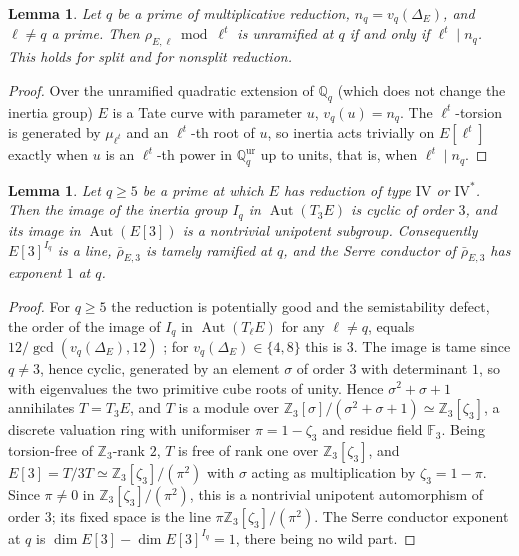 \documentclass[11pt]{amsart}
\newtheorem{lemma}[theorem]{Lemma}
\theoremstyle{definition}
\newcommand{\Q}{\mathbb{Q}}
\newcommand{\Z}{\mathbb{Z}}
\newcommand{\F}{\mathbb{F}}
\begin{document}
\begin{lemma}\label{lem:tamagawa-exp}
Let $q$ be a prime of multiplicative reduction, $n_q=v_q(\Delta_E)$, and $\ell\ne q$ a prime. Then $\rho_{E,\ell}\bmod\ell^t$ is unramified at $q$ if and only if $\ell^t\mid n_q$. This holds for split and for nonsplit reduction.
\end{lemma}

\begin{proof}
Over the unramified quadratic extension of $\Q_q$ (which does not change the inertia group) $E$ is a Tate curve with parameter $u$, $v_q(u)=n_q$. The $\ell^t$-torsion is generated by $\mu_{\ell^t}$ and an $\ell^t$-th root of $u$, so inertia acts trivially on $E[\ell^t]$ exactly when $u$ is an $\ell^t$-th power in $\Q_q^{\mathrm{ur}}$ up to units, that is, when $\ell^t\mid n_q$.
\end{proof}

\begin{lemma}\label{lem:IV}
Let $q\ge5$ be a prime at which $E$ has reduction of type $\mathrm{IV}$ or $\mathrm{IV}^*$. Then the image of the inertia group $I_q$ in $\operatorname{Aut}(T_3E)$ is cyclic of order $3$, and its image in $\operatorname{Aut}(E[3])$ is a nontrivial unipotent subgroup. Consequently $E[3]^{I_q}$ is a line, $\bar\rho_{E,3}$ is tamely ramified at $q$, and the Serre conductor of $\bar\rho_{E,3}$ has exponent $1$ at $q$.
\end{lemma}

\begin{proof}
For $q\ge5$ the reduction is potentially good and the semistability defect, the order of the image of $I_q$ in $\operatorname{Aut}(T_\ell E)$ for any $\ell\ne q$, equals $12/\gcd(v_q(\Delta_E),12)$ \cite{Kraus90}; for $v_q(\Delta_E)\in\{4,8\}$ this is $3$. The image is tame since $q\ne3$, hence cyclic, generated by an element $\sigma$ of order $3$ with determinant $1$, so with eigenvalues the two primitive cube roots of unity. Hence $\sigma^2+\sigma+1$ annihilates $T=T_3E$, and $T$ is a module over $\Z_3[\sigma]/(\sigma^2+\sigma+1)\simeq\Z_3[\zeta_3]$, a discrete valuation ring with uniformiser $\pi=1-\zeta_3$ and residue field $\F_3$. Being torsion-free of $\Z_3$-rank $2$, $T$ is free of rank one over $\Z_3[\zeta_3]$, and $E[3]=T/3T\simeq\Z_3[\zeta_3]/(\pi^2)$ with $\sigma$ acting as multiplication by $\zeta_3=1-\pi$. Since $\pi\ne0$ in $\Z_3[\zeta_3]/(\pi^2)$, this is a nontrivial unipotent automorphism of order $3$; its fixed space is the line $\pi\Z_3[\zeta_3]/(\pi^2)$. The Serre conductor exponent at $q$ is $\dim E[3]-\dim E[3]^{I_q}=1$, there being no wild part.
\end{proof}
\end{document}
